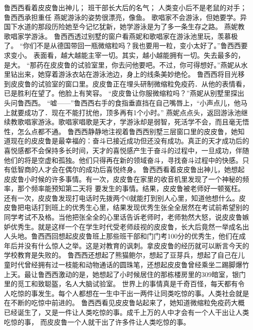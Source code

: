 \documentclass[a4paper,12pt,UTF8,twoside]{ctexbook}
\begin{document}
        鲁西西看着皮皮鲁出神儿；  
        班干部长大后的名气；  
        人类变小后不是老鼠的对手；  
        鲁西西承担重任    
        燕妮游泳的姿势很漂亮，像鱼。  
        歌唱家不会游泳，但她要学。异国下水道的那段历险她至今记忆犹新，她学游泳是为了多一条生存之路。  
        燕妮教歌唱家学游泳。  
        鲁西西透过别墅的窗户看燕妮和歌唱家在游泳池里玩，羡慕极了。  
        “你们不是从德国带回一瓶微缩粒吗？我也要用一粒，变小太好了。”鲁西西要求变小。  
        表面看，越大越能主宰一切。其实，越小越能拥有一切。失去最多的，是大。        
        “那药在皮皮鲁的试验室里，你去问他要吧。不过，你可得想好。”燕妮从水里钻出来，她穿着游泳衣站在游泳池边，身上的线条美妙绝伦。  
        鲁西西将目光移到皮皮鲁的试验室的窗口里。皮皮鲁正在埋头研制微缩粒免疫药．从他的表情看，已是胜利在望了。他脸上有笑容。  
        “皮皮鲁让你服微缩粒吗？”燕妮从别墅里探出头问鲁西西。  
        “嘘——”鲁西西右手的食指垂直挡在自己嘴唇上，“小声点儿，他马上就要成功了．现在不能打扰他，顶多再有1个小时。”  
        燕妮点点头，返回游泳池继续教歌唱家游泳。歌唱家唱歌是天才，学游泳却是弱智，死活学不会，而且毫无悟性，怎么点都不通。  
        鲁西西静静地注视着鲁西西别墅三层窗口里的皮皮鲁，她知道现在的皮皮鲁是最幸福的：奋斗已接近成功但还没有成功。真正的天才成功后的喜悦感都不会保持多长时间，天才的喜悦感产生于奋斗的过程中，一旦成功，伴随他们的将是空虚和孤独。他们只得再在新的领域奋斗，寻找奋斗过程中的快感。只有低智商的人才会在偶尔的成功后喜悦终身。  
        鲁西西看着皮皮鲁出神儿，她想起皮皮鲁小时候的许多事情。有一次，皮皮鲁在家里的收音机里发现了一个神秘的频率，那个频率能预知第二天将        要发生的事情。结果，皮皮鲁被老师好一顿冤枉。还有一次，皮皮鲁发现打电话时先拨两个0就能打到别人心里，知道他想什么。皮皮鲁把电话打到班上的优秀生心里，结果发现优秀生张全全居然在考试前希望别的同学考试不及格。当他把张全全的心里话告诉老师时，老师勃然大怒，说皮皮鲁嫉妒优秀生。就是这样一个在学生时代受老师歧视的皮皮鲁，长大后竟然一举成名出人头地。鲁西西回想起皮皮鲁班上那些班干部和门门考100分的优秀生，他们在成年后并没有什么惊人之举。这是对教育的讽刺。拿皮皮鲁的经历就可以断言今天的学校教育是失败的。  
        鲁西西还想起了熊猫鲍尔，想起了豆芽兵，想起了自己在儿童时代曾经拥有过一枝能和动物通话的圆珠笔，还想起皮皮鲁曾经乘坐二踢脚爆竹上天。最让鲁西西激动的是，她想起了小时候居住的那栋楼房里的309暗室，银门里的觅工和致聪盔，名人大脑试验室。  
        世界上的事情真是千奇百怪，每天都有令人吃惊的事发生。每个人都想在一生中干出一两件让同类吃惊的事。人类社会就是在不断的吃惊中前进的。  
        鲁西西看见皮皮鲁站起来了，她知道微缩粒免疫药大概已经诞生了，又是一件让人类吃惊的事。成千上万的人中才会有一个人干出让人类吃惊的事，        而皮皮鲁一个人就干出了许多件让人类吃惊的事。  
\end{document}
